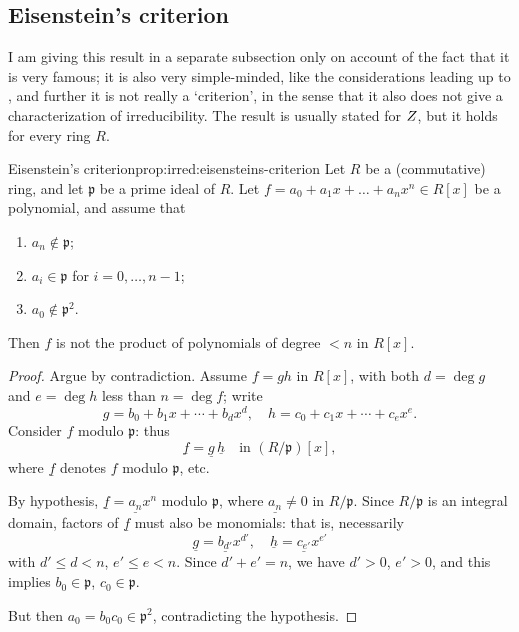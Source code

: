 \subsection{Eisenstein's criterion}
\label{subsec:irred:eisenstein-s-criterion}
I am giving this result in a separate subsection only on account of
the fact that it is very famous; it is also very simple-minded, like
the considerations leading up to , and further
it is not really a `criterion', in the sense that it also does not
give a characterization of irreducibility. The result is usually
stated for $Z$, but it holds for every ring $R$.
\begin{prop}{Eisenstein's criterion}{prop:irred:eisensteins-criterion}
  Let $R$ be a (commutative) ring, and let $\mathfrak{p}$ be a prime
  ideal of $R$. Let $f = a_0 + a_1 x + \dots + a_n x^n \in R[x]$ be a
  polynomial, and assume that
  \begin{enumerate}[label=(\arabic*)]
  \item $a_n \notin \mathfrak{p}$;
  \item $a_i \in \mathfrak{p}$ for $i = 0, \ldots, n - 1$;
  \item $a_0 \notin \mathfrak{p}^2$.
  \end{enumerate}
  Then $f$ is not the product of polynomials of degree $< n$ in
  $R[x]$.
\end{prop}
\begin{proof}
  Argue by contradiction. Assume $f = gh$ in $R[x]$, with both
  $d = \deg g$ and $e = \deg h$ less than $n = \deg f$; write
  \[g = b_0 + b_1 x + \cdots + b_d x^d, \quad h = c_0 + c_1 x + \cdots
    + c_e x^e.\] Consider $f$ modulo $\mathfrak{p}$: thus
  \[\underline{f} = \underline{g}\,\underline{h}
    \quad \text{in } (R/\mathfrak{p})[x],\] where $\underline{f}$
  denotes $f$ modulo $\mathfrak{p}$, etc.

  By hypothesis, $\underline{f} = \underline{a_n} x^n$ modulo
  $\mathfrak{p}$, where $\underline{a_n} \neq 0$ in
  $R/\mathfrak{p}$. Since $R/\mathfrak{p}$ is an integral domain,
  factors of $\underline{f}$ must also be monomials: that is,
  necessarily
  \[\underline{g} = \underline{b_{d'}} x^{d'},
    \quad \underline{h} = \underline{c_{e'}} x^{e'}\] with
  $d' \leq d < n$, $e' \leq e < n$. Since $d' + e' = n$, we have
  $d' > 0$, $e' > 0$, and this implies $b_0 \in \mathfrak{p}$,
  $c_0 \in \mathfrak{p}$.

  But then $a_0 = b_0 c_0 \in \mathfrak{p}^2$, contradicting the
  hypothesis.
\end{proof}

